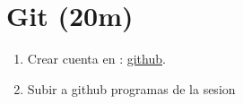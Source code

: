 \documentclass{beamer}
\begin{document}
\section{Git (20m) }

\begin{frame}

\begin{enumerate}
\item
	Crear cuenta en : \href{https://github.com/adsoftsito/python/blob/master/w1/vi-editor.pdf}{github}.

    
\item
	Subir a github programas de la sesion


\end{enumerate} 


\end{frame}
\end{document}
